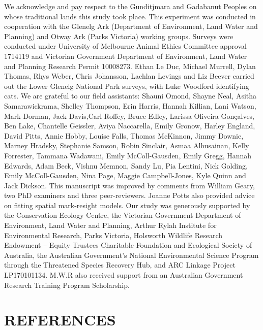 \documentclass[preprint, 3p, authoryear]{elsarticle} %
\begin{document}
We acknowledge and pay respect to the Gunditjmara and Gadabanut Peoples on whose traditional lands this study took place. This experiment was conducted in cooperation with the Glenelg Ark (Department of Environment, Land Water and Planning) and Otway Ark (Parks Victoria) working groups. Surveys were conducted under University of Melbourne Animal Ethics Committee approval 1714119 and Victorian Government Department of Environment, Land Water and Planning Research Permit 10008273. Ethan Le Duc, Michael Murrell, Dylan Thomas, Rhys Weber, Chris Johansson, Lachlan Levings and Liz Beever carried out the Lower Glenelg National Park surveys, with Luke Woodford identifying cats. We are grateful to our field assistants: Shauni Omond, Shayne Neal, Asitha Samarawickrama, Shelley Thompson, Erin Harris, Hannah Killian, Lani Watson, Mark Dorman, Jack Davis,Carl Roffey, Bruce Edley, Larissa Oliveira Gonçalves, Ben Lake, Chantelle Geissler, Aviya Naccarella, Emily Gronow, Harley England, David Pitts, Annie Hobby, Louise Falls, Thomas McKinnon, Jimmy Downie, Marney Hradsky, Stephanie Samson, Robin Sinclair, Asmaa Alhusainan, Kelly Forrester, Tammana Wadawani, Emily McColl-Gausden, Emily Gregg, Hannah Edwards, Adam Beck, Vishnu Memnon, Sandy Lu, Pia Lentini, Nick Golding, Emily McColl-Gausden, Nina Page, Maggie Campbell-Jones, Kyle Quinn and Jack Dickson. This manuscript was improved by comments from William Geary, two PhD examiners and three peer-reviewers. Joanne Potts also provided advice on fitting spatial mark-resight models. Our study was generously supported by the Conservation Ecology Centre, the Victorian Government Department of Environment, Land Water and Planning, Arthur Rylah Institute for Environmental Research, Parks Victoria, Holsworth Wildlife Research Endowment -- Equity Trustees Charitable Foundation and Ecological Society of Australia, the Australian Government's National Environmental Science Program through the Threatened Species Recovery Hub, and ARC Linkage Project LP170101134. M.W.R also received support from an Australian Government Research Training Program Scholarship.

\newpage

\hypertarget{references}{%
\section*{REFERENCES}\label{references}}
\end{document}

